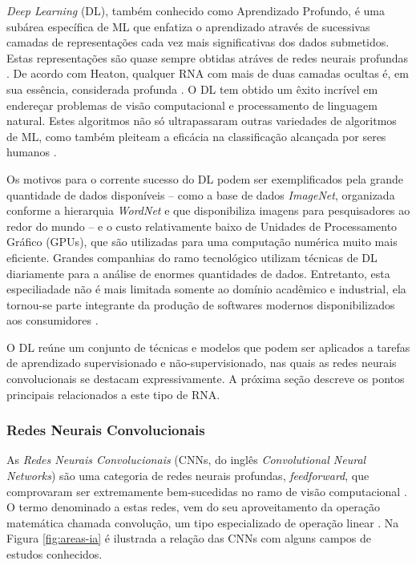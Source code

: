 
\emph{Deep Learning} (DL), também conhecido como Aprendizado Profundo, é uma subárea específica de ML que enfatiza o aprendizado através de sucessivas camadas de representações cada vez mais significativas dos dados submetidos. Estas representações são quase sempre obtidas atráves de redes neurais profundas \cite{chollet}. De acordo com Heaton, qualquer RNA com mais de duas camadas ocultas é, em sua essência, considerada profunda \cite{heaton}. O DL tem obtido um êxito incrível em endereçar problemas de visão computacional e processamento de linguagem natural. Estes algoritmos não só ultrapassaram outras variedades de algoritmos de ML, como também pleiteam a eficácia na classificação alcançada por seres humanos \cite{buduma}.

Os motivos para o corrente sucesso do DL podem ser exemplificados pela grande quantidade de dados disponíveis -- como a base de dados \emph{ImageNet}, organizada conforme a hierarquia \emph{WordNet} e que disponibiliza imagens para pesquisadores ao redor do mundo \cite{imagenet} -- e o custo relativamente baixo de Unidades de Processamento Gráfico (GPUs), que são utilizadas para uma computação numérica muito mais eficiente. Grandes companhias do ramo tecnológico utilizam técnicas de DL diariamente para a análise de enormes quantidades de dados. Entretanto, esta especiliadade não é mais limitada somente ao domínio acadêmico e industrial, ela tornou-se parte integrante da produção de softwares modernos disponibilizados aos consumidores \cite{gulli}.

O DL reúne um conjunto de técnicas e modelos que podem ser aplicados a tarefas de aprendizado supervisionado e não-supervisionado, nas quais as redes neurais convolucionais se destacam expressivamente. A próxima seção descreve os pontos principais relacionados a este tipo de RNA.

\subsubsection{Redes Neurais Convolucionais}
\label{subsubsec:cnns}

As \emph{Redes Neurais Convolucionais} (CNNs, do inglês \emph{Convolutional Neural Networks}) são uma categoria de redes neurais profundas, \emph{feedforward}, que comprovaram ser extremamente bem-sucedidas no ramo de visão computacional \cite{khan}. O termo denominado a estas redes, vem do seu aproveitamento da operação matemática chamada convolução, um tipo especializado de operação linear \cite{goodfellow}. Na Figura \ref{fig:areas-ia} é ilustrada a relação das CNNs com alguns campos de estudos conhecidos.

